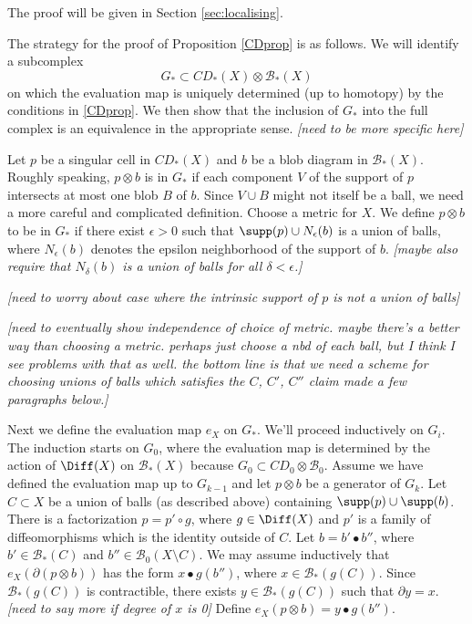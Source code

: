 \documentclass[11pt,leqno]{amsart}
\def\bc{{\mathcal B}}
\def\bd{\partial}
\def\sub{\subset}
\def\setmin{\setminus}
\def\nn#1{{{\it \small [#1]}}}
\begin{document}
The proof will be given in Section \ref{sec:localising}.

\medskip

The strategy for the proof of Proposition \ref{CDprop} is as follows.
We will identify a subcomplex
\[
    G_* \sub CD_*(X) \otimes \bc_*(X)
\]
on which the evaluation map is uniquely determined (up to homotopy) by the conditions
in \ref{CDprop}.
We then show that the inclusion of $G_*$ into the full complex
is an equivalence in the appropriate sense.
\nn{need to be more specific here}

Let $p$ be a singular cell in $CD_*(X)$ and $b$ be a blob diagram in $\bc_*(X)$.
Roughly speaking, $p\otimes b$ is in $G_*$ if each component $V$ of the support of $p$
intersects at most one blob $B$ of $b$.
Since $V \cup B$ might not itself be a ball, we need a more careful and complicated definition.
Choose a metric for $X$.
We define $p\otimes b$ to be in $G_*$ if there exist $\epsilon > 0$ such that
$\supp(p) \cup N_\epsilon(b)$ is a union of balls, where $N_\epsilon(b)$ denotes the epsilon
neighborhood of the support of $b$.
\nn{maybe also require that $N_\delta(b)$ is a union of balls for all $\delta<\epsilon$.}

\nn{need to worry about case where the intrinsic support of $p$ is not a union of balls}

\nn{need to eventually show independence of choice of metric.  maybe there's a better way than
choosing a metric.  perhaps just choose a nbd of each ball, but I think I see problems
with that as well.
the bottom line is that we need a scheme for choosing unions of balls
which satisfies the $C$, $C'$, $C''$ claim made a few paragraphs below.}

Next we define the evaluation map $e_X$ on $G_*$.
We'll proceed inductively on $G_i$.
The induction starts on $G_0$, where the evaluation map is determined
by the action of $\Diff(X)$ on $\bc_*(X)$
because $G_0 \sub CD_0\otimes \bc_0$.
Assume we have defined the evaluation map up to $G_{k-1}$ and
let $p\otimes b$ be a generator of $G_k$.
Let $C \sub X$ be a union of balls (as described above) containing $\supp(p)\cup\supp(b)$.
There is a factorization $p = p' \circ g$, where $g\in \Diff(X)$ and $p'$ is a family of diffeomorphisms which is the identity outside of $C$.
Let $b = b'\bullet b''$, where $b' \in \bc_*(C)$ and $b'' \in \bc_0(X\setmin C)$.
We may assume inductively  that $e_X(\bd(p\otimes b))$ has the form $x\bullet g(b'')$, where
$x \in \bc_*(g(C))$.
Since $\bc_*(g(C))$ is contractible, there exists $y \in \bc_*(g(C))$ such that $\bd y = x$.
\nn{need to say more if degree of $x$ is 0}
Define $e_X(p\otimes b) = y\bullet g(b'')$.
\end{document}
